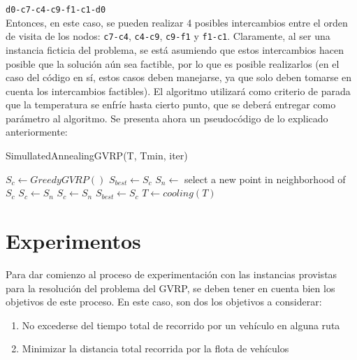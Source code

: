 \documentclass[letter, 10pt]{article}
\begin{document}
\texttt{d0-c7-c4-c9-f1-c1-d0}\\

Entonces, en este caso, se pueden realizar 4 posibles intercambios entre el orden de visita de los nodos: \texttt{c7-c4}, \texttt{c4-c9}, \texttt{c9-f1} y \texttt{f1-c1}. Claramente, al ser una instancia ficticia del problema, se está asumiendo que estos intercambios hacen posible que la solución aún sea factible, por lo que es posible realizarlos (en el caso del código en sí, estos casos deben manejarse, ya que solo deben tomarse en cuenta los intercambios factibles). El algoritmo utilizará como criterio de parada que la temperatura se enfríe hasta cierto punto, que se deberá entregar como parámetro al algoritmo. Se presenta ahora un pseudocódigo de lo explicado anteriormente:

\begin{algorithm}
\caption{SimullatedAnnealingGVRP(T, Tmin, iter)}\label{alg:cap}
    \begin{algorithmic}
        \State $S_c \gets GreedyGVRP()$
        \State $S_{best} \gets S_c$
            \State $S_{n} \gets $ select a new point in neighborhood of $S_c$
                \State $S_{c} \gets S_n$
                \State $S_{c} \gets S_n$
            \EndIf
                \State $S_{best} \gets S_c$
            \EndIf
        \State $T \gets cooling(T)$
        \EndWhile
    \end{algorithmic}
\end{algorithm}

\section{Experimentos}
\label{experimentos}
Para dar comienzo al proceso de experimentación con las instancias provistas para la resolución del problema del GVRP, se deben tener en cuenta bien los objetivos de este proceso. En este caso, son dos los objetivos a considerar:

\begin{enumerate}
    \item No excederse del tiempo total de recorrido por un vehículo en alguna ruta
    \item Minimizar la distancia total recorrida por la flota de vehículos
\end{enumerate}
\end{document}
